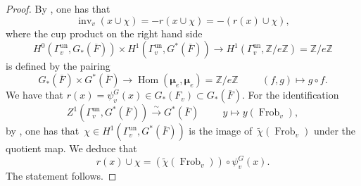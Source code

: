 \documentclass[a4paper,english,12pt]{amsart}
\newcommand{\oF}{\overline F}
\newcommand{\ZZ}{\mathbb{Z}}
\newcommand{\Fv}{F_v}
\newcommand{\muu}{\boldsymbol{\mu}}
\DeclareMathOperator{\Hom}{Hom}
\DeclareMathOperator{\Id}{Id}
\DeclareMathOperator{\Frob}{Frob}
\DeclareMathOperator{\un}{un}
\DeclareMathOperator{\inv}{inv}
\numberwithin{equation}{subsection}
\begin{document}
\begin{proof}
By \cite[Proposition 6.6]{cohomologicalinvariants}, one has that $$\inv_v(x\cup\chi)=-r(x\cup \chi)=-(r(x)\cup \chi),$$
where the cup product on the right hand side $$H^0(\Gamma_v^{\un}, G_*(\oF))\times H^1(\Gamma_v^{\un}, G^*(\oF)) \to H^1(\Gamma_v^{\un}, \ZZ/e\ZZ)=\ZZ/e\ZZ$$ is defined by the pairing %
$$G_*(\oF)\times G^*(\oF)\to \Hom(\muu_e,\muu_e)=\ZZ/e\ZZ\hspace{1cm}(f,g)\mapsto g\circ f.$$ We have that $r(x)=\psi^G_v(x)\in G_*(\Fv)\subset G_*(\oF)$. For the identification $$Z^1(\Gamma_v^{\un}, G^*(\oF))\xrightarrow{\sim} G^*(\oF)\hspace{1cm} y\mapsto y(\Frob_v),$$ by \cite[Chapter XIII, Proposition 1]{corpslocaux}, one has that~$\chi\in H^1(\Gamma_v^{\un}, G^*(\oF))$ is the image of~$\widetilde\chi (\Frob_v)$ under the quotient map. We deduce that 
$$r(x)\cup\chi=(\widetilde\chi (\Frob_v))\circ\psi^G_v(x).$$ The statement follows.
%
%
\end{proof}
\end{document}
